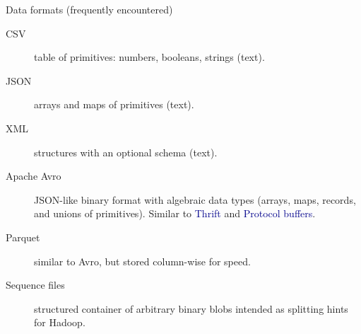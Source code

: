 \documentclass{beamer}
\begin{document}
\begin{frame}{Data formats (frequently encountered)}
\begin{description}

\item[CSV] table of primitives: numbers, booleans, strings (text).
\item[JSON] arrays and maps of primitives (text).
\item[XML] structures with an optional schema (text).
\item[Apache Avro] JSON-like binary format with algebraic data types (arrays, maps, records, and unions of primitives). Similar to \textcolor{darkblue}{Thrift} and \textcolor{darkblue}{Protocol buffers}.
\item[Parquet] similar to Avro, but stored column-wise for speed.
\item[Sequence files] structured container of arbitrary binary blobs intended as splitting hints for Hadoop.



\end{description}
\end{frame}



\end{document}
